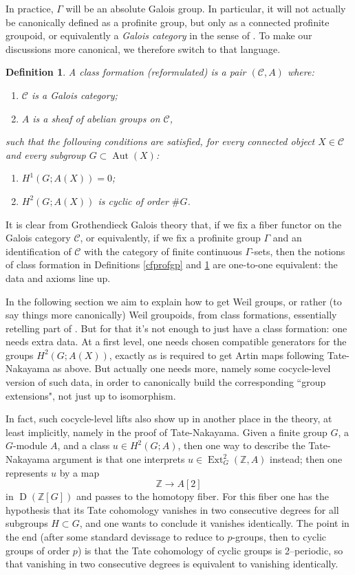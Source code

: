 \documentclass[12pt]{article}
\newtheorem{definition}[theorem]{Definition}
\theoremstyle{definition}
\newcommand{\on}{\operatorname}
\newcommand{\mc}{\mathcal}
\newcommand{\mbb}{\mathbb}
\begin{document}
In practice, $\Gamma$ will be an absolute Galois group.  In particular, it will not actually be canonically defined as a profinite group, but only as a connected profinite groupoid, or equivalently a \emph{Galois category} in the sense of \cite{SGA1}.  To make our discussions more canonical, we therefore switch to that language.

\begin{definition}\label{cfgal}
A \emph{class formation} (reformulated) is a pair $(\mc{C},A)$ where:
\begin{enumerate}
\item $\mc{C}$ is a Galois category;
\item $A$ is a sheaf of abelian groups on $\mc{C}$,
\end{enumerate}
such that the following conditions are satisfied, for every connected object $X\in\mc{C}$ and every subgroup $G\subset \on{Aut}(X)$:
\begin{enumerate}
\item $H^1(G;A(X))=0$;
\item $H^2(G;A(X))$ is cyclic of order $\#G$.
\end{enumerate}
\end{definition}

It is clear from Grothendieck Galois theory that, if we fix a fiber functor on the Galois category $\mc{C}$, or equivalently, if we fix a profinite group $\Gamma$ and an identification of $\mc{C}$ with the category of finite continuous $\Gamma$-sets, then the notions of class formation in Definitions \ref{cfprofgp} and \ref{cfgal} are one-to-one equivalent: the data and axioms line up.

In the following section we aim to explain how to get Weil groups, or rather (to say things more canonically) Weil groupoids, from class formations, essentially retelling part of \cite{artintate}.  But for that it's not enough to just have a class formation: one needs extra data.  At a first level, one needs chosen compatible generators for the groups $H^2(G;A(X))$, exactly as is required to get Artin maps following Tate-Nakayama as above.  But actually one needs more, namely some cocycle-level version of such data, in order to canonically build the corresponding ``group extensions", not just up to isomorphism.

In fact, such cocycle-level lifts also show up in another place in the theory, at least implicitly, namely in the proof of Tate-Nakayama.  Given a finite group $G$, a $G$-module $A$, and a class $u\in H^2(G;A)$, then one way to describe the Tate-Nakayama argument is that one interprets $u\in \on{Ext}^2_G(\mbb{Z},A)$ instead; then one represents $u$ by a map 
$$\mbb{Z} \to A[2]$$
in $\on{D}(\mbb{Z}[G])$ and passes to the homotopy fiber.  For this fiber one has the hypothesis that its Tate cohomology vanishes in two consecutive degrees for all subgroups $H\subset G$, and one wants to conclude it vanishes identically.  The point in the end (after some standard devissage to reduce to $p$-groups, then to cyclic groups of order $p$) is that the Tate cohomology of cyclic groups is 2--periodic, so that vanishing in two consecutive degrees is equivalent to vanishing identically.
\end{document}
